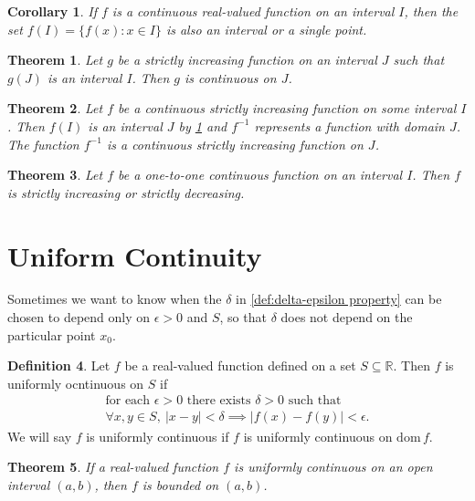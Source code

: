 \documentclass[12pt, lettersize]{book}
\theoremstyle{plain}
\newtheorem{thm}{Theorem}[section]
\newtheorem{cor}{Corollary}[thm]
\theoremstyle{definition}
\newtheorem{dfn}[thm]{Definition}
\theoremstyle{remark}
\newcommand{\R}{\mathbb{R}}
\newcommand{\dom}{\text{dom}\,}
\begin{document}
		\begin{cor}\label{def:18.3}
			If $f$ is a continuous real-valued function on an interval $I$, then the set $f(I)=\{f(x): x\in I\}$ is also
			an interval or a single point.
		\end{cor}
		
		\begin{thm}\label{def:18.5}
			Let $g$ be a strictly increasing function on an interval $J$ such that $g(J)$ is an interval $I$. Then $g$ is
			continuous on $J$.
		\end{thm}
		
		\begin{thm}\label{def:18.4}
			Let $f$ be a continuous strictly increasing function on some interval $I$. Then $f(I)$ is an interval $J$ by \ref{def:18.3} and $f^{-1}$ represents a function with domain $J$. The function $f^{-1}$ is a continuous strictly increasing function on $J$.
		\end{thm}
		
		\setcounter{equation}{0}
		\begin{thm}
			Let $f$ be a \emph{one-to-one} continuous function on an interval $I$. Then $f$ is strictly increasing or strictly decreasing.
		\end{thm}
		\newpage
		
		\section{Uniform Continuity}
		Sometimes we want to know when the $\delta$ in \ref{def:delta-epsilon property} can be chosen to depend only on
		$\epsilon>0$ and $S$, so that $\delta$ does not depend on the particular point $x_0$.
		\begin{dfn}
			Let $f$ be a real-valued function defined on a set $S\subseteq\R$. Then $f$ is uniformly ocntinuous on $S$ if
			\begin{align*}
				\text{for each $\epsilon>0$ there exists $\delta>0$ such that}\\
				\text{$\forall x,y\in S,\ |x-y|<\delta\implies|f(x)-f(y)|<\epsilon.$}
			\end{align*}
			We will say $f$ is uniformly continuous if $f$ is uniformly continuous on $\dom f$.
		\end{dfn}
		
		\begin{thm}
			If a real-valued function $f$ is uniformly continuous on an open interval $(a,b)$, then $f$ is \emph{bounded} on $(a,b)$.
		\end{thm}
		
\end{document}
